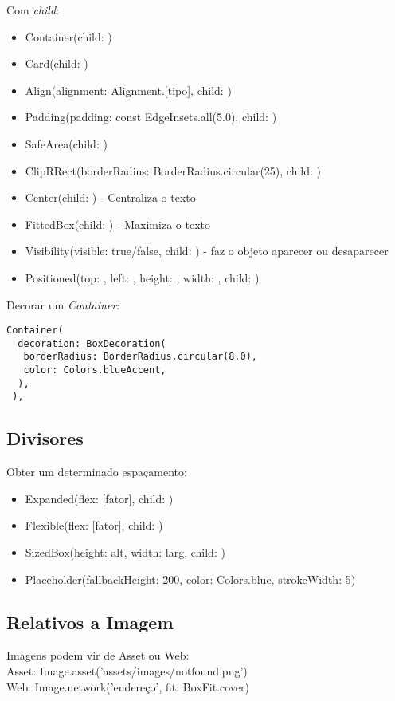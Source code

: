 \documentclass[11pt]{scrartcl}
\begin{document}
Com \textit{child}:
\begin{itemize}[nolistsep]
	\item {\ttfamily Container(child: )}
	\item {\ttfamily Card(child: )}
	\item {\ttfamily Align(alignment: Alignment.[tipo], child: )}
	\item {\ttfamily Padding(padding: const EdgeInsets.all(5.0), child: )}
	\item {\ttfamily SafeArea(child: )}
	\item {\ttfamily ClipRRect(borderRadius: BorderRadius.circular(25), child: )}
	\item {\ttfamily Center(child: )} - Centraliza o texto
	\item {\ttfamily FittedBox(child: )} - Maximiza o texto
	\item {\ttfamily Visibility(visible: true/false, child: )} - faz o objeto aparecer ou desaparecer
	\item {\ttfamily Positioned(top: , left: , height: , width: , child: )}
\end{itemize}

Decorar um \textit{Container}:
\begin{lstlisting}[]
 Container(
  decoration: BoxDecoration(
   borderRadius: BorderRadius.circular(8.0),
   color: Colors.blueAccent,
  ),
 ),
\end{lstlisting}

\subsection{Divisores}
Obter um determinado espaçamento:
\begin{itemize}[nolistsep]
	\item {\ttfamily Expanded(flex: [fator], child: )}
	\item {\ttfamily Flexible(flex: [fator], child: )}
	\item {\ttfamily SizedBox(height: alt, width: larg, child: )}
	\item {\ttfamily Placeholder(fallbackHeight: 200, color: Colors.blue, strokeWidth: 5)}
\end{itemize}

\subsection{Relativos a Imagem}
Imagens podem vir de Asset ou Web: \\
Asset: {\ttfamily Image.asset('assets/images/notfound.png')} \\
Web: {\ttfamily Image.network('endereço', fit: BoxFit.cover)}
\end{document}

